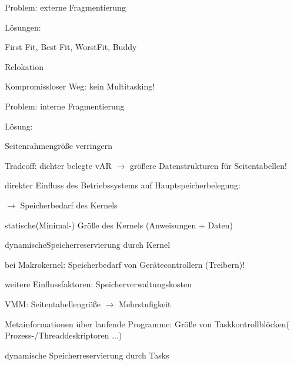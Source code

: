 \documentclass[a4paper]{article}
\begin{document}
\begin{multicols}{3}
    Problem: externe Fragmentierung

    \begin{itemize*}
        \item
        \item
        Lösungen:
        \begin{itemize*}
            \item First Fit, Best Fit, WorstFit, Buddy
            \item Relokation
        \end{itemize*}
        \item
        Kompromissloser Weg: kein Multitasking!
    \end{itemize*}

    Problem: interne Fragmentierung

    \begin{itemize*}
        \item
        \item
        Lösung:
        \begin{itemize*}
            \item Seitenrahmengröße verringern
            \item Tradeoff: dichter belegte vAR $\rightarrow$ größere Datenstrukturen für Seitentabellen!
        \end{itemize*}
        \item
        direkter Einfluss des Betriebssystems auf Hauptspeicherbelegung:
        \begin{itemize*}
            \item $\rightarrow$ Speicherbedarf des Kernels
            \item statische(Minimal-) Größe des Kernels (Anweisungen + Daten)
            \item dynamischeSpeicherreservierung durch Kernel
            \item bei Makrokernel: Speicherbedarf von Gerätecontrollern (Treibern)!
        \end{itemize*}
    \end{itemize*}

    weitere Einflussfaktoren: Speicherverwaltungskosten

    \begin{itemize*}
        \item
        VMM: Seitentabellengröße $\rightarrow$ Mehrstufigkeit
        \item
        Metainformationen über laufende Programme: Größe von
        Taskkontrollblöcken( Prozess-/Threaddeskriptoren ...)
        \item
        dynamische Speicherreservierung durch Tasks
    \end{itemize*}



\end{multicols}
\end{document}
